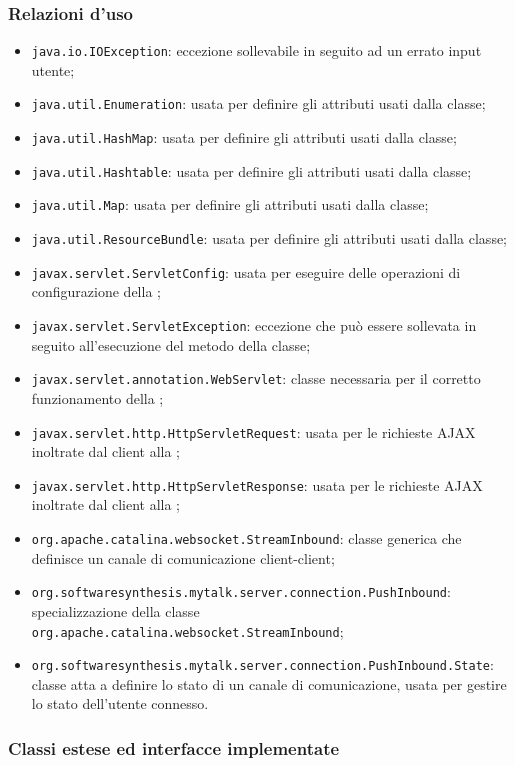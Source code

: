 \subsubsection*{Relazioni d'uso}
\begin{itemize}
	\item \texttt{java.io.IOException}: eccezione sollevabile in seguito ad un errato input utente;
	\item \texttt{java.util.Enumeration}: usata per definire gli attributi usati dalla classe;
	\item \texttt{java.util.HashMap}: usata per definire gli attributi usati dalla classe;
	\item \texttt{java.util.Hashtable}: usata per definire gli attributi usati dalla classe;
	\item \texttt{java.util.Map}: usata per definire gli attributi usati dalla classe;
	\item \texttt{java.util.ResourceBundle}: usata per definire gli attributi usati dalla classe;
	\item \texttt{javax.servlet.ServletConfig}: usata per eseguire delle operazioni di configurazione della ;
	\item \texttt{javax.servlet.ServletException}: eccezione che può essere sollevata in seguito all'esecuzione del metodo  della classe;
	\item \texttt{javax.servlet.annotation.WebServlet}: classe necessaria per il corretto funzionamento della ;
	\item \texttt{javax.servlet.http.HttpServletRequest}: usata per le richieste AJAX inoltrate dal client alla ;
	\item \texttt{javax.servlet.http.HttpServletResponse}: usata per le richieste AJAX inoltrate dal client alla ;
	\item \texttt{org.apache.catalina.websocket.StreamInbound}: classe generica che definisce un canale di comunicazione client-client;
	\item \texttt{org.softwaresynthesis.mytalk.server.connection.PushInbound}: specializzazione della classe \texttt{org.apache.catalina.websocket.StreamInbound};
	\item \texttt{org.softwaresynthesis.mytalk.server.connection.PushInbound.State}: classe atta a definire lo stato di un canale di comunicazione, usata per gestire lo stato dell'utente connesso.
\end{itemize}

\subsubsection*{Classi estese ed interfacce implementate}

